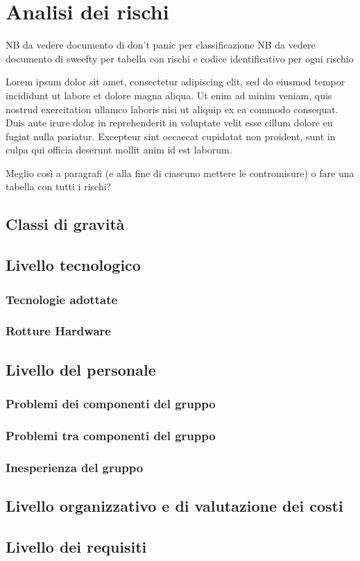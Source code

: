 \newpage
\section{Analisi dei rischi} \label{AnalisiDeiRischi}
	
	NB da vedere documento di don't panic per classificazione
	NB da vedere documento di sweefty per tabella con rischi e codice identificativo per ogni rischio
	
	Lorem ipsum dolor sit amet, consectetur adipiscing elit, sed do eiusmod tempor incididunt ut labore et dolore magna aliqua. Ut enim ad minim veniam, quis nostrud exercitation ullamco laboris nisi ut aliquip ex ea commodo consequat. Duis aute irure dolor in reprehenderit in voluptate velit esse cillum dolore eu fugiat nulla pariatur. Excepteur sint occaecat cupidatat non proident, sunt in culpa qui officia deserunt mollit anim id est laborum.
	
	Meglio così a paragrafi (e alla fine di ciascuno mettere le contromisure) o fare una tabella con tutti i rischi?
	
	\subsection{Classi di gravità}
	
	\subsection{Livello tecnologico}
	\subsubsection{Tecnologie adottate}
	\subsubsection{Rotture Hardware}
	
	\subsection{Livello del personale}
	\subsubsection{Problemi dei componenti del gruppo}
	\subsubsection{Problemi tra componenti del gruppo}
	\subsubsection{Inesperienza del gruppo}
	
	\subsection{Livello organizzativo e di valutazione dei costi}
	\subsection{Livello dei requisiti}
